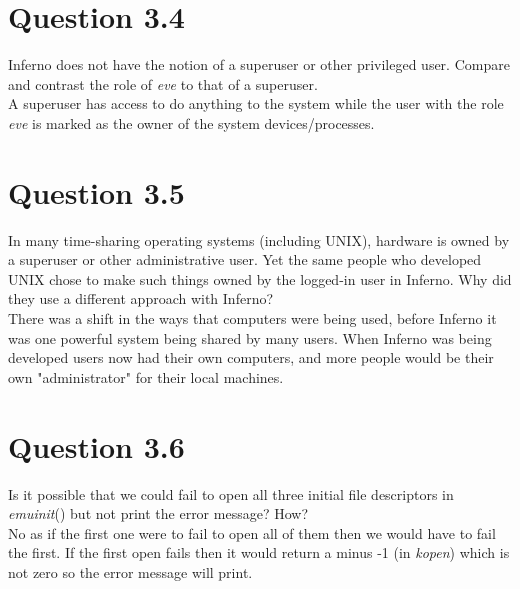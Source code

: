 \documentclass{article}
\begin{document}
\section*{Question 3.4}
Inferno does not have the notion of a superuser or other privileged user.
Compare and contrast the role of \emph{eve} to that of a superuser.
\\
A superuser has access to do anything to the system while the user with the role \emph{eve} is marked as the owner of the system devices/processes.

\section*{Question 3.5}
In many time-sharing operating systems (including UNIX), hardware is owned by a superuser or other administrative user.
Yet the same people who developed UNIX chose to make such things owned by the logged-in user in Inferno.
Why did they use a different approach with Inferno?
\\
There was a shift in the ways that computers were being used, before Inferno it was one powerful system being shared by many users.
When Inferno was being developed users now had their own computers, and more people would be their own "administrator" for their local machines.

\section*{Question 3.6}
Is it possible that we could fail to open all three initial file descriptors in \emph{emuinit}() but not print the error message? How?
\\
No as if the first one were to fail to open all of them then we would have to fail the first.
If the first open fails then it would return a minus -1 (in \emph{kopen}) which is not zero so the error message will print.
\end{document}
